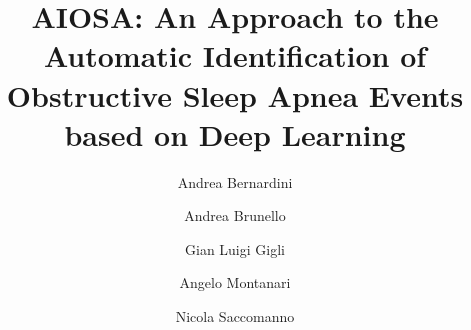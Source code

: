 \documentclass[5p,twocolumn,lefttitle]{elsarticle}
\begin{document}
\begin{frontmatter}

\title{AIOSA: An Approach to the Automatic Identification of Obstructive Sleep Apnea Events based on Deep Learning}

\author[1]{Andrea Bernardini}

\author[2]{Andrea Brunello}

\author[1]{Gian Luigi Gigli}

\author[2]{Angelo Montanari}

\author[2]{Nicola Saccomanno}

\address[1]{Clinical Neurology Unit, Udine University Hospital, Piazzale Santa Maria della Misericordia, 15, 33100 Udine, Italy}
\address[2]{Department of Mathematics, Computer Science, and Physics, University of Udine, Via delle Scienze 206, 33100 Udine, Italy}


\end{frontmatter}
\end{document}
